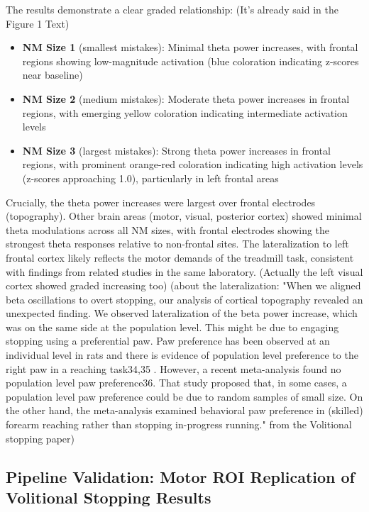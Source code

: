 \documentclass[11pt]{article}
\begin{document}
The results demonstrate a clear graded relationship: (It's already said in the Figure 1 Text)
\begin{itemize}
\item \textbf{NM Size 1} (smallest mistakes): Minimal theta power increases, with frontal regions showing low-magnitude activation (blue coloration indicating z-scores near baseline)
\item \textbf{NM Size 2} (medium mistakes): Moderate theta power increases in frontal regions, with emerging yellow coloration indicating intermediate activation levels
\item \textbf{NM Size 3} (largest mistakes): Strong theta power increases in frontal regions, with prominent orange-red coloration indicating high activation levels (z-scores approaching 1.0), particularly in left frontal areas
\end{itemize}

Crucially, the theta power increases were largest over frontal electrodes (topography). Other brain areas (motor, visual, posterior cortex) showed minimal theta modulations across all NM sizes, with frontal electrodes showing the strongest theta responses relative to non-frontal sites. The lateralization to left frontal cortex likely reflects the motor demands of the treadmill task, consistent with findings from related studies in the same laboratory. (Actually the left visual cortex showed graded increasing too) (about the lateralization: "When we aligned beta oscillations to overt stopping, our analysis of cortical topography revealed an 
unexpected finding. We observed lateralization of the beta power increase, which was on the same side at 
the population level. This might be due to engaging stopping using a preferential paw. Paw preference has 
been observed at an individual level in rats and there is evidence of population level preference to the right 
paw in a reaching task34,35 . However, a recent meta-analysis found no population level paw preference36. 
That study proposed that, in some cases, a population level paw preference could be due to random 
samples of small size. On the other hand, the meta-analysis examined behavioral paw preference in 
(skilled) forearm reaching rather than stopping in-progress running." from the Volitional stopping paper)


\subsection{Pipeline Validation: Motor ROI Replication of Volitional Stopping Results}
\end{document}
